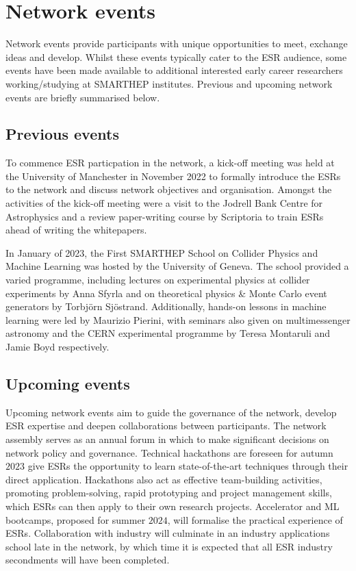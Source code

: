 \section{Network events}
\label{events}
Network events provide participants with unique opportunities to meet, exchange ideas and develop. Whilst these events typically cater to the ESR audience, some events have been made available to additional interested early career researchers working/studying at SMARTHEP institutes. Previous and upcoming network events are briefly summarised below.

\subsection{Previous events}
\label{previous-events}
To commence ESR particpation in the network, a kick-off meeting was held at the University of Manchester in November 2022 to formally introduce the ESRs to the network and discuss network objectives and organisation. Amongst the activities of the kick-off meeting were a visit to the Jodrell Bank Centre for Astrophysics and a review paper-writing course by Scriptoria to train ESRs ahead of writing the whitepapers.

In January of 2023, the First SMARTHEP School on Collider Physics and Machine Learning was hosted by the University of Geneva. The school provided a varied programme, including lectures on experimental physics at collider experiments by Anna Sfyrla and on theoretical physics \& Monte Carlo event generators by Torbj\"orn Sj\"ostrand. Additionally, hands-on lessons in machine learning were led by Maurizio Pierini, with seminars also given on multimessenger astronomy and the CERN experimental programme by Teresa Montaruli and Jamie Boyd respectively.

\subsection{Upcoming events}
\label{upcoming-events}
Upcoming network events aim to guide the governance of the network, develop ESR expertise and deepen collaborations between participants. The network assembly serves as an annual forum in which to make significant decisions on network policy and governance. Technical hackathons are foreseen for autumn $2023$ give ESRs the opportunity to learn state-of-the-art techniques through their direct application. Hackathons also act as effective team-building activities, promoting problem-solving, rapid prototyping and project management skills, which ESRs can then apply to their own research projects. Accelerator and ML bootcamps, proposed for summer $2024$, will formalise the practical experience of ESRs. Collaboration with industry will culminate in an industry applications school late in the network, by which time it is expected that all ESR industry secondments will have been completed.

